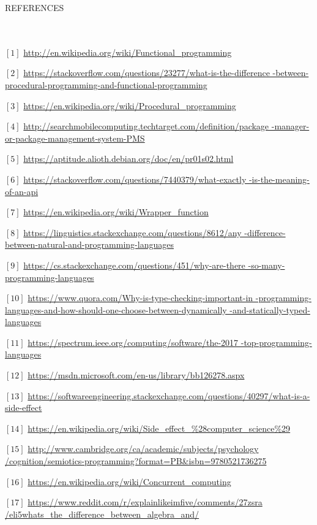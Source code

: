 \documentclass{article}
\begin{document}
\newpage

\begin{large}
REFERENCES
\end{large}
\newline
\newline
\newline\\
\\
$ [1]$ \url{http://en.wikipedia.org/wiki/Functional_programming}

$ [2]$ \url{https://stackoverflow.com/questions/23277/what-is-the-difference
-between-procedural-programming-and-functional-programming}

$ [3]$ \url{https://en.wikipedia.org/wiki/Procedural_programming}

$ [4]$ \url{http://searchmobilecomputing.techtarget.com/definition/package
-manager-or-package-management-system-PMS}

$ [5]$ \url{https://aptitude.alioth.debian.org/doc/en/pr01s02.html}

$ [6]$ \url{https://stackoverflow.com/questions/7440379/what-exactly
-is-the-meaning-of-an-api}

$ [7]$ \url{https://en.wikipedia.org/wiki/Wrapper_function}

$ [8]$ \url{https://linguistics.stackexchange.com/questions/8612/any
-difference-between-natural-and-programming-languages}

$ [9]$ \url{https://cs.stackexchange.com/questions/451/why-are-there
-so-many-programming-languages}

$[10]$ \url{https://www.quora.com/Why-is-type-checking-important-in
-programming-languages-and-how-should-one-choose-between-dynamically
-and-statically-typed-languages}

$[11]$ \url{https://spectrum.ieee.org/computing/software/the-2017
-top-programming-languages}

$[12]$ \url{https://msdn.microsoft.com/en-us/library/bb126278.aspx}

$[13]$ \url{https://softwareengineering.stackexchange.com/questions/40297/what-is-a-side-effect}

$[14]$ \url{https://en.wikipedia.org/wiki/Side_effect_%28computer_science%29}

$[15]$ \url{http://www.cambridge.org/ca/academic/subjects/psychology
/cognition/semiotics-programming?format=PB&isbn=9780521736275}

$[16]$ \url{https://en.wikipedia.org/wiki/Concurrent_computing}

$[17]$ \url{https://www.reddit.com/r/explainlikeimfive/comments/27zsra
/eli5whats_the_difference_between_algebra_and/}
\end{document}
